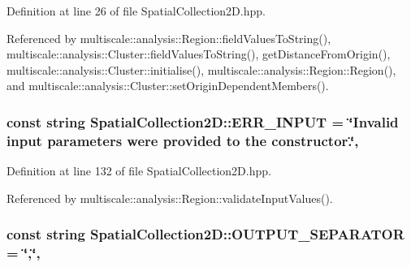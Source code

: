 Definition at line 26 of file Spatial\-Collection2\-D.\-hpp.



Referenced by multiscale\-::analysis\-::\-Region\-::field\-Values\-To\-String(), multiscale\-::analysis\-::\-Cluster\-::field\-Values\-To\-String(), get\-Distance\-From\-Origin(), multiscale\-::analysis\-::\-Cluster\-::initialise(), multiscale\-::analysis\-::\-Region\-::\-Region(), and multiscale\-::analysis\-::\-Cluster\-::set\-Origin\-Dependent\-Members().

\hypertarget{classmultiscale_1_1analysis_1_1SpatialCollection2D_ae6688ddf08e23397e0798e4280d7f1ab}{
\subsubsection[{E\-R\-R\-\_\-\-I\-N\-P\-U\-T}]{\setlength{\rightskip}{0pt plus 5cm}const string Spatial\-Collection2\-D\-::\-E\-R\-R\-\_\-\-I\-N\-P\-U\-T = \char`\"{}Invalid input parameters were provided to the constructor.\char`\"{}\hspace{0.3cm}{\ttfamily [static]}, {\ttfamily [protected]}}}\label{classmultiscale_1_1analysis_1_1SpatialCollection2D_ae6688ddf08e23397e0798e4280d7f1ab}


Definition at line 132 of file Spatial\-Collection2\-D.\-hpp.



Referenced by multiscale\-::analysis\-::\-Region\-::validate\-Input\-Values().

\hypertarget{classmultiscale_1_1analysis_1_1SpatialCollection2D_a489bef8926aecc45acb7f54d8802def1}{
\subsubsection[{O\-U\-T\-P\-U\-T\-\_\-\-S\-E\-P\-A\-R\-A\-T\-O\-R}]{\setlength{\rightskip}{0pt plus 5cm}const string Spatial\-Collection2\-D\-::\-O\-U\-T\-P\-U\-T\-\_\-\-S\-E\-P\-A\-R\-A\-T\-O\-R = \char`\"{},\char`\"{}\hspace{0.3cm}{\ttfamily [static]}, {\ttfamily [protected]}}}\label{classmultiscale_1_1analysis_1_1SpatialCollection2D_a489bef8926aecc45acb7f54d8802def1}


